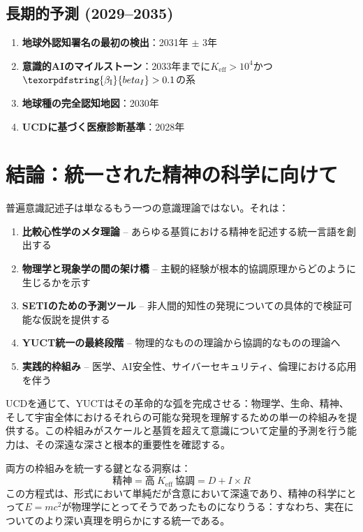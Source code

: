 \documentclass[11pt,a4paper]{article}
\DeclareRobustCommand{\beI}{\texorpdfstring{\ensuremath{\beta_{\mathrm{I}}}}{beta_I}}
\newcommand{\eff}{\mathrm{eff}}
\newcommand{\Ke}{K_{\eff}}
\begin{document}
	\subsection{長期的予測 (2029--2035)}
	
	\begin{enumerate}
		\item \textbf{地球外認知署名の最初の検出}：2031年 \(\pm\) 3年
		\item \textbf{意識的AIのマイルストーン}：2033年までに\(\Ke > 10^4\)かつ\(\beI > 0.1\)の系
		\item \textbf{地球種の完全認知地図}：2030年
		\item \textbf{UCDに基づく医療診断基準}：2028年
	\end{enumerate}
	
	\section{結論：統一された精神の科学に向けて}
	
	普遍意識記述子は単なるもう一つの意識理論ではない。それは：
	\begin{enumerate}
		\item \textbf{比較心性学のメタ理論} -- あらゆる基質における精神を記述する統一言語を創出する
		\item \textbf{物理学と現象学の間の架け橋} -- 主観的経験が根本的協調原理からどのように生じるかを示す
		\item \textbf{SETIのための予測ツール} -- 非人間的知性の発現についての具体的で検証可能な仮説を提供する
		\item \textbf{YUCT統一の最終段階} -- 物理的なものの理論から協調的なものの理論へ
		\item \textbf{実践的枠組み} -- 医学、AI安全性、サイバーセキュリティ、倫理における応用を伴う
	\end{enumerate}
	
	UCDを通じて、YUCTはその革命的な弧を完成させる：物理学、生命、精神、そして宇宙全体におけるそれらの可能な発現を理解するための単一の枠組みを提供する。この枠組みがスケールと基質を超えて意識について定量的予測を行う能力は、その深遠な深さと根本的重要性を確認する。
	
	両方の枠組みを統一する鍵となる洞察は：
	\[
	\boxed{\text{精神} = \text{高}\ \Ke\ \text{協調} = D + I \times R}
	\]
	この方程式は、形式において単純だが含意において深遠であり、精神の科学にとって\(E = mc^2\)が物理学にとってそうであったものになりうる：すなわち、実在についてのより深い真理を明らかにする統一である。
	
\end{document}
